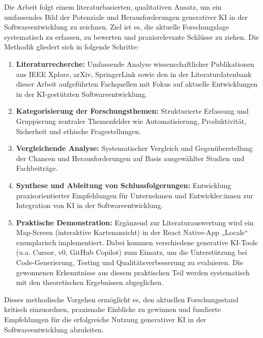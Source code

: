 
Die Arbeit folgt einem literaturbasierten, qualitativen Ansatz, um ein
umfassendes Bild der Potenziale und Herausforderungen generativer KI in der
Softwareentwicklung zu zeichnen. Ziel ist es, die aktuelle Forschungslage
systematisch zu erfassen, zu bewerten und praxisrelevante Schlüsse zu ziehen.
Die Methodik gliedert sich in folgende Schritte:

\begin{enumerate}
    \item \textbf{Literaturrecherche:} Umfassende Analyse wissenschaftlicher Publikationen aus IEEE Xplore, arXiv, SpringerLink sowie den in der Literaturdatenbank dieser Arbeit aufgeführten Fachquellen mit Fokus auf aktuelle Entwicklungen in der KI-gestützten Softwareentwicklung.
    \item \textbf{Kategorisierung der Forschungsthemen:} Strukturierte Erfassung und Gruppierung zentraler Themenfelder wie Automatisierung, Produktivität, Sicherheit und ethische Fragestellungen.
    \item \textbf{Vergleichende Analyse:} Systematischer Vergleich und Gegenüberstellung der Chancen und Herausforderungen auf Basis ausgewählter Studien und Fachbeiträge.
    \item \textbf{Synthese und Ableitung von Schlussfolgerungen:} Entwicklung praxisorientierter Empfehlungen für Unternehmen und Entwickler:innen zur Integration von KI in der Softwareentwicklung.
    \item \textbf{Praktische Demonstration:} Ergänzend zur Literaturauswertung wird ein Map-Screen (interaktive Kartenansicht) in der React Native-App „Locals“ exemplarisch implementiert. Dabei kommen verschiedene generative KI-Tools (u.a. Cursor, v0, GitHub Copilot) zum Einsatz, um die Unterstützung bei Code-Generierung, Testing und Qualitätsverbesserung zu evaluieren. Die gewonnenen Erkenntnisse aus diesem praktischen Teil werden systematisch mit den theoretischen Ergebnissen abgeglichen.
\end{enumerate}

Dieses methodische Vorgehen ermöglicht es, den aktuellen Forschungsstand
kritisch einzuordnen, praxisnahe Einblicke zu gewinnen und fundierte
Empfehlungen für die erfolgreiche Nutzung generativer KI in der
Softwareentwicklung abzuleiten.
